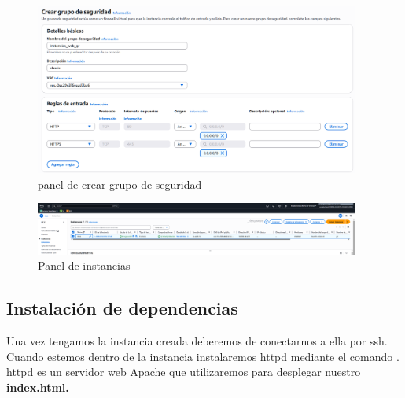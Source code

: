 \documentclass{article}
\begin{document}
	\begin{figure}[H]
	\centering
	\includegraphics[width=0.95\textwidth]{crear_grupo_seguridad.png}
	\caption{panel de crear grupo de seguridad}
	\end{figure}

	\begin{figure}[H]
	\centering
	\includegraphics[width=0.95\textwidth]{pestanya_instancias.png}
	\caption{Panel de instancias}
	\end{figure}
\newpage

	\subsection{Instalación de dependencias}

		Una vez tengamos la instancia creada deberemos de conectarnos a ella por ssh. Cuando estemos dentro de la instancia instalaremos httpd mediante el comando  . httpd es un servidor web Apache que utilizaremos para desplegar nuestro \textbf{index.html.}
\end{document}
